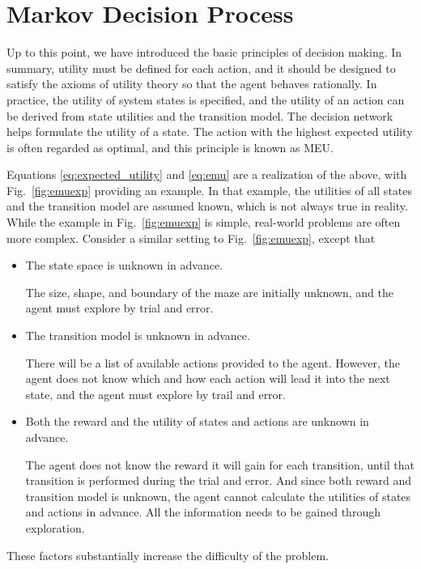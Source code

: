 \section{Markov Decision Process} \label{sec:mdp}

Up to this point, we have introduced the basic principles of decision making. In summary, utility must be defined for each action, and it should be designed to satisfy the axioms of utility theory so that the agent behaves rationally. In practice, the utility of system states is specified, and the utility of an action can be derived from state utilities and the transition model. The decision network helps formulate the utility of a state. The action with the highest expected utility is often regarded as optimal, and this principle is known as MEU.

Equations \eqref{eq:expected_utility} and \eqref{eq:emu} are a realization of the above, with Fig.~\ref{fig:emuexp} providing an example. In that example, the utilities of all states and the transition model are assumed known, which is not always true in reality. While the example in Fig.~\ref{fig:emuexp} is simple, real-world problems are often more complex. Consider a similar setting to Fig.~\ref{fig:emuexp}, except that
\begin{itemize}
	\item The state space is unknown in advance. 
	
	The size, shape, and boundary of the maze are initially unknown, and the agent must explore by trial and error.
	
	\item The transition model is unknown in advance. 
	
	There will be a list of available actions provided to the agent. However, the agent does not know which and how each action will lead it into the next state, and the agent must explore by trail and error.
	
	\item Both the reward and the utility of states and actions are unknown in advance.
	
	The agent does not know the reward it will gain for each transition, until that transition is performed during the trial and error. And since both reward and transition model is unknown, the agent cannot calculate the utilities of states and actions in advance. All the information needs to be gained through exploration.
\end{itemize}
These factors substantially increase the difficulty of the problem.

